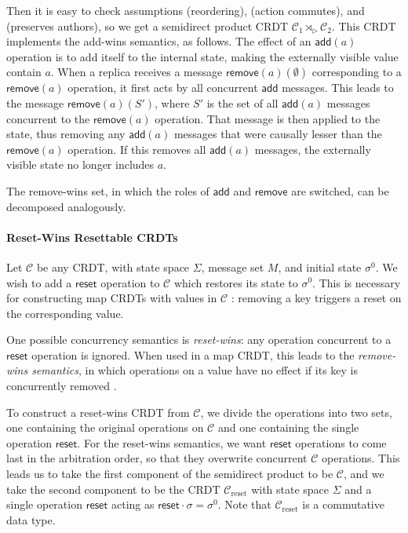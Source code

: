 \documentclass[acmsmall,nonacm,12pt]{acmart}
\newcommand{\mc}[1]{\ensuremath{\mathcal{#1}}}
\newcommand{\msf}[1]{\ensuremath{\mathsf{#1}}}
\newcommand{\act}{\triangleright}
\theoremstyle{plain}
\theoremstyle{definition}
\begin{document}
Then it is easy to check assumptions (reordering), (action commutes), and (preserves authors), so we get a semidirect product CRDT $\mc{C}_1 \rtimes_\act \mc{C}_2$.  This CRDT implements the add-wins semantics, as follows.  The effect of an $\msf{add}(a)$ operation is to add itself to the internal state, making the externally visible value contain $a$.  When a replica receives a message $\msf{remove}(a)(\emptyset)$ corresponding to a $\msf{remove}(a)$ operation, it first acts by all concurrent $\msf{add}$ messages.  This leads to the message $\msf{remove}(a)(S')$, where $S'$ is the set of all $\msf{add}(a)$ messages concurrent to the $\msf{remove}(a)$ operation.  That message is then applied to the state, thus removing any $\msf{add}(a)$ messages that were causally lesser than the $\msf{remove}(a)$ operation.  If this removes all $\msf{add}(a)$ messages, the externally visible state no longer includes $a$.

The remove-wins set, in which the roles of $\msf{add}$ and $\msf{remove}$ are switched, can be decomposed analogously.




\paragraph{Reset-Wins Resettable CRDTs}
Let $\mc{C}$ be any CRDT, with state space $\Sigma$, message set $M$, and initial state $\sigma^0$.  We wish to add a $\msf{reset}$ operation to $\mc{C}$ which restores its state to $\sigma^0$.  This is necessary for constructing map CRDTs with values in $\mc{C}$ \cite{riak_datatypes, antidote}: removing a key triggers a reset on the corresponding value.

One possible concurrency semantics is \textit{reset-wins}: any operation concurrent to a $\msf{reset}$ operation is ignored.  When used in a map CRDT, this leads to the \textit{remove-wins semantics}, in which operations on a value have no effect if its key is concurrently removed \cite[\S 2.1.5]{crdt_overview_preguica}.

To construct a reset-wins CRDT from $\mc{C}$, we divide the operations into two sets, one containing the original operations on $\mc{C}$ and one containing the single operation $\msf{reset}$.  For the reset-wins semantics, we want $\msf{reset}$ operations to come last in the arbitration order, so that they overwrite concurrent $\mc{C}$ operations.  This leads us to take the first component of the semidirect product to be $\mc{C}$, and we take the second component to be the CRDT $\mc{C}_{\text{reset}}$ with state space $\Sigma$ and a single operation $\msf{reset}$ acting as $\msf{reset} \cdot \sigma = \sigma^0$.  Note that $\mc{C}_{\text{reset}}$ is a commutative data type.
\end{document}
